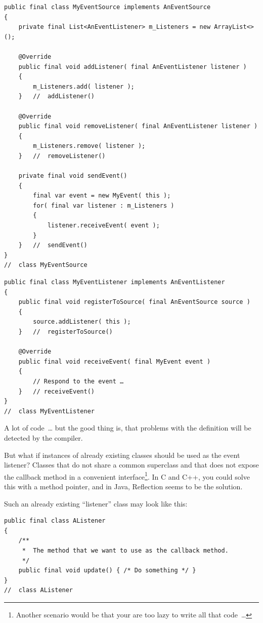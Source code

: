 \documentclass[11pt,a4paper, titlepage, parskip=half, headsepline, footsepline, cleardoublepage=current, headheight=1cm]{scrbook}
\begin{document}
\begin{lstlisting}
public final class MyEventSource implements AnEventSource
{
    private final List<AnEventListener> m_Listeners = new ArrayList<>();
    
    @Override
    public final void addListener( final AnEventListener listener )
    {
        m_Listeners.add( listener );
    }   //  addListener()
    
    @Override
    public final void removeListener( final AnEventListener listener )
    {
        m_Listeners.remove( listener );
    }   //  removeListener()
    
    private final void sendEvent()
    {
        final var event = new MyEvent( this );
        for( final var listener : m_Listeners )
        {
            listener.receiveEvent( event );
        }
    }   //  sendEvent()
}
//  class MyEventSource
\end{lstlisting}

\begin{lstlisting}
public final class MyEventListener implements AnEventListener
{
    public final void registerToSource( final AnEventSource source )
    {
        source.addListener( this );
    }	//	registerToSource()

    @Override    
    public final void receiveEvent( final MyEvent event )
    {
        // Respond to the event …
    }   // receiveEvent()
}
//  class MyEventListener
\end{lstlisting}

A lot of code~… but the good thing is, that problems with the definition will be detected by the compiler.

But what if instances of already existing classes should be used as the event listener? Classes that do not share a common superclass and that does not expose the callback method in a convenient interface\footnote{Another scenario would be that your are too lazy to write all that code~…}. In C and C++, you could solve this with a method pointer, and in Java, Reflection seems to be the solution.

Such an already existing “listener” class may look like this:
\begin{lstlisting}
public final class AListener
{
    /**
     *  The method that we want to use as the callback method.
     */
    public final void update() { /* Do something */ }
}
//  class AListener
\end{lstlisting}
\end{document}
